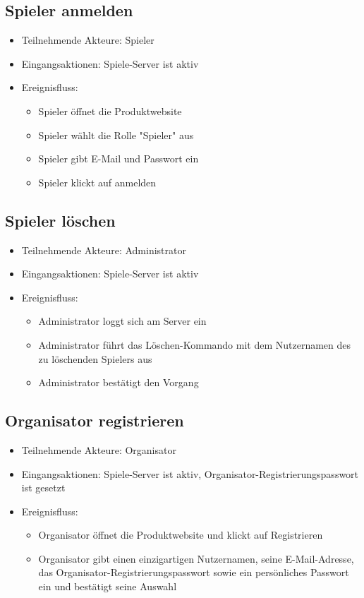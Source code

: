 \documentclass[a4paper]{scrreprt}
\begin{document}
    \subsection{Spieler anmelden}
    \begin{itemize}
        \item Teilnehmende Akteure: \Gls{Spieler}
        \item Eingangsaktionen: Spiele-Server ist aktiv
        \item Ereignisfluss:
        \begin{itemize}
            \item \Gls{Spieler} öffnet die Produktwebsite
            \item \Gls{Spieler} wählt die Rolle "\Gls{Spieler}" aus
            \item \Gls{Spieler} gibt E-Mail und Passwort ein
            \item \Gls{Spieler} klickt auf anmelden
        \end{itemize}
    \end{itemize}

    \subsection{Spieler löschen}
    \begin{itemize}
        \item Teilnehmende Akteure: \Gls{Administrator}
        \item Eingangsaktionen: Spiele-Server ist aktiv
        \item Ereignisfluss:
        \begin{itemize}
            \item \Gls{Administrator} loggt sich am Server ein
            \item \Gls{Administrator} führt das Löschen-Kommando mit dem Nutzernamen des zu löschenden \Gls{Spieler}s aus
            \item \Gls{Administrator} bestätigt den Vorgang
        \end{itemize}
    \end{itemize}

    \subsection{Organisator registrieren}
    \begin{itemize}
        \item Teilnehmende Akteure: \Gls{Organisator}
        \item Eingangsaktionen: Spiele-Server ist aktiv, Organisator-Registrierungspasswort ist gesetzt
        \item Ereignisfluss:
        \begin{itemize}
            \item \Gls{Organisator} öffnet die Produktwebsite und klickt auf Registrieren
            \item \Gls{Organisator} gibt einen einzigartigen Nutzernamen, seine E-Mail-Adresse, das Organisator-Registrierungspasswort sowie ein persönliches Passwort ein und bestätigt seine Auswahl
        \end{itemize}
    \end{itemize}
\end{document}
